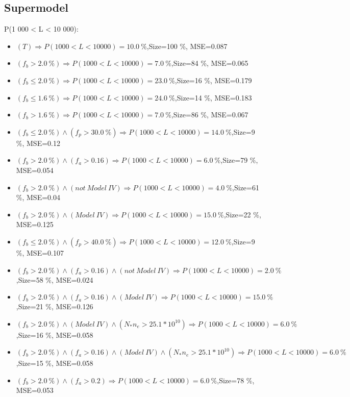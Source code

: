\documentclass[numbered]{CSL}
\begin{document}
\subsection{Supermodel}
P(1 000 < L < 10 000):
\begin{itemize}
\item $(T) \Rightarrow P(1 000 < L < 10 000) = 10.0~\%$,\hfill Size=100 \%, MSE=0.087
\item $(f_b > 2.0~\%) \Rightarrow P(1 000 < L < 10 000) = 7.0~\%$,\hfill Size=84 \%, MSE=0.065
\item $(f_b \leq 2.0~\%) \Rightarrow P(1 000 < L < 10 000) = 23.0~\%$,\hfill Size=16 \%, MSE=0.179
\item $(f_b \leq 1.6~\%) \Rightarrow P(1 000 < L < 10 000) = 24.0~\%$,\hfill Size=14 \%, MSE=0.183
\item $(f_b > 1.6~\%) \Rightarrow P(1 000 < L < 10 000) = 7.0~\%$,\hfill Size=86 \%, MSE=0.067
\item $(f_b \leq 2.0~\%) \land (f_p > 30.0~\%) \Rightarrow P(1 000 < L < 10 000) = 14.0~\%$,\hfill Size=9 \%, MSE=0.12
\item $(f_b > 2.0~\%) \land (f_a > 0.16) \Rightarrow P(1 000 < L < 10 000) = 6.0~\%$,\hfill Size=79 \%, MSE=0.054
\item $(f_b > 2.0~\%) \land (not~Model~IV) \Rightarrow P(1 000 < L < 10 000) = 4.0~\%$,\hfill Size=61 \%, MSE=0.04
\item $(f_b > 2.0~\%) \land (Model~IV) \Rightarrow P(1 000 < L < 10 000) = 15.0~\%$,\hfill Size=22 \%, MSE=0.125
\item $(f_b \leq 2.0~\%) \land (f_p > 40.0~\%) \Rightarrow P(1 000 < L < 10 000) = 12.0~\%$,\hfill Size=9 \%, MSE=0.107
\item $(f_b > 2.0~\%) \land (f_a > 0.16) \land (not~Model~IV) \Rightarrow P(1 000 < L < 10 000) = 2.0~\%$,\hfill Size=58 \%, MSE=0.024
\item $(f_b > 2.0~\%) \land (f_a > 0.16) \land (Model~IV) \Rightarrow P(1 000 < L < 10 000) = 15.0~\%$,\hfill Size=21 \%, MSE=0.126
\item $(f_b > 2.0~\%) \land (Model~IV) \land (N_* n_e > 25.1 * 10^{10}) \Rightarrow P(1 000 < L < 10 000) = 6.0~\%$,\hfill Size=16 \%, MSE=0.058
\item $(f_b > 2.0~\%) \land (f_a > 0.16) \land (Model~IV) \land (N_* n_e > 25.1 * 10^{10}) \Rightarrow P(1 000 < L < 10 000) = 6.0~\%$,\hfill Size=15 \%, MSE=0.058
\item $(f_b > 2.0~\%) \land (f_a > 0.2) \Rightarrow P(1 000 < L < 10 000) = 6.0~\%$,\hfill Size=78 \%, MSE=0.053

\end{itemize}
\end{document}
